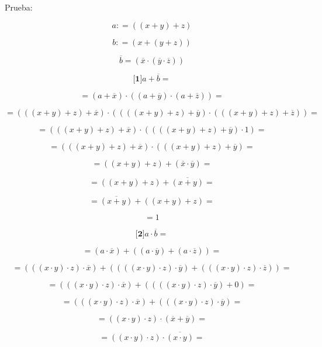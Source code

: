 \documentclass[
]{article}
\begin{document}
\begin{enumerate}
\begin{enumerate}
\begin{enumerate}
\begin{enumerate}
        Prueba:

        \[a{: = {({{({x + y})} + z})}}\]

        \[b{: = {({x + {({y + z})}})}}\]

        \[\overline{b}{= {({\overline{x} \cdot {({\overline{y} \cdot \overline{z}})}})}}\]

        \[{\lbrack\mathbf{1}\rbrack}{{a + \overline{b}} =}\]

        \[{= {{({a + \overline{x}})} \cdot {({{({a + \overline{y}})} \cdot {({a + \overline{z}})}})}}} =\]

        \[{= {{({{({{({x + y})} + z})} + \overline{x}})} \cdot {({{({{({{({x + y})} + z})} + \overline{y}})} \cdot {({{({{({x + y})} + z})} + \overline{z}})}})}}} =\]

        \[{= {{({{({{({x + y})} + z})} + \overline{x}})} \cdot {({{({{({{({x + y})} + z})} + \overline{y}})} \cdot 1})}}} =\]

        \[{= {{({{({{({x + y})} + z})} + \overline{x}})} \cdot {({{({{({x + y})} + z})} + \overline{y}})}}} =\]

        \[{= {{({{({x + y})} + z})} + {({\overline{x} \cdot \overline{y}})}}} =\]

        \[{= {{({{({x + y})} + z})} + \overline{({x+y})}}} =\]

        \[{= {\overline{({x+y})} + {({{({x + y})} + z})}}} =\]

        \[= 1\]

        \[{\lbrack\mathbf{2}\rbrack}{{a \cdot \overline{b}} =}\]

        \[{= {{({a \cdot \overline{x}})} + {({{({a \cdot \overline{y}})} + {({a \cdot \overline{z}})}})}}} =\]

        \[{= {{({{({{({x \cdot y})} \cdot z})} \cdot \overline{x}})} + {({{({{({{({x \cdot y})} \cdot z})} \cdot \overline{y}})} + {({{({{({x \cdot y})} \cdot z})} \cdot \overline{z}})}})}}} =\]

        \[{= {{({{({{({x \cdot y})} \cdot z})} \cdot \overline{x}})} + {({{({{({{({x \cdot y})} \cdot z})} \cdot \overline{y}})} + 0})}}} =\]

        \[{= {{({{({{({x \cdot y})} \cdot z})} \cdot \overline{x}})} + {({{({{({x \cdot y})} \cdot z})} \cdot \overline{y}})}}} =\]

        \[{= {{({{({x \cdot y})} \cdot z})} \cdot {({\overline{x} + \overline{y}})}}} =\]

        \[{= {{({{({x \cdot y})} \cdot z})} \cdot \overline{({x\cdot y})}}} =\]


\end{enumerate}
\end{enumerate}
\end{enumerate}
\end{enumerate}
\end{document}
